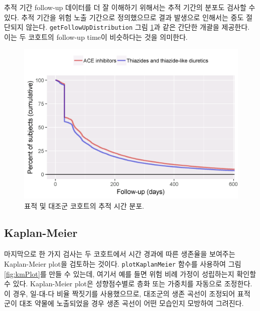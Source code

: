\documentclass[10.5pt]{book}
\theoremstyle{definition}
\theoremstyle{definition}
\theoremstyle{definition}
\theoremstyle{remark}
\begin{document}
추적 기간 follow-up 데이터를 더 잘 이해하기 위해서는 추적 기간의 분포도
검사할 수 있다. 추적 기간을 위험 노출 기간으로 정의했으므로 결과
발생으로 인해서는 중도 절단되지 않는다. \texttt{getFollowUpDistribution}
그림 \ref{fig:followUp}과 같은 간단한 개괄을 제공한다. 이는 두 코호트의
follow-up time이 비슷하다는 것을 의미한다.

\begin{figure}

{\centering \includegraphics[width=0.8\linewidth]{images/PopulationLevelEstimation/followUp} 

}

\caption{표적 및 대조군 코호트의 추적 시간 분포.}\label{fig:followUp}
\end{figure}

\subsection{Kaplan-Meier}\label{kaplan-meier}

마지막으로 한 가지 검사는 두 코호트에서 시간 경과에 따른 생존율을
보여주는 Kaplan-Meier plot을 검토하는 것이다. \texttt{plotKaplanMeier}
함수를 사용하여 그림 \ref{fig:kmPlot}를 만들 수 있는데, 여기서 예를 들면
위험 비례 가정이 성립하는지 확인할 수 있다. Kaplan-Meier plot은
성향점수별로 층화 또는 가중치를 자동으로 조정한다. 이 경우, 일-대-다
비율 짝짓기를 사용했으므로, 대조군의 생존 곡선이 조정되어 표적 군이 대조
약물에 노출되었을 경우 생존 곡선이 어떤 모습인지 모방하여 그려진다.
 
\end{document}
